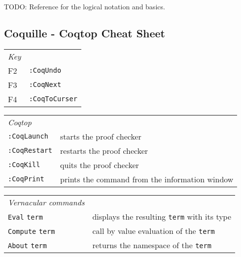 TODO: Reference for the logical notation and basics.

\subsection{Coquille - Coqtop Cheat Sheet}

\begin{table}[h]
		\begin{left}
			\begin{tabular}{l|l}
			  \emph{Key}\\ 		
		      F2      & \lstinline!:CoqUndo! \\ 	     	                                                   
		      F3      & \lstinline!:CoqNext! \\         
		      F4      & \lstinline!:CoqToCurser!  
		    \end{tabular}
		\end{left}
		\label{tab:coquilleCheatSheetKeys}
	\end{table}		    
\begin{table}[h]
		\begin{left}		    	
		    \begin{tabular}{l|l}
		    \emph{Coqtop}\\
		    \lstinline!:CoqLaunch!  &   starts the proof checker\\   
		    \lstinline!:CoqRestart! &   restarts the proof checker \\       
		    \lstinline!:CoqKill!    &   quits the proof checker \\        
		    \lstinline!:CoqPrint!   &   prints the command from the information window \\
		    \end{tabular}
		    \label{tab:coquilleCheatSheetCoqTop}
		\end{left} 
	\end{table}			    
\begin{table}[h]
		\begin{left}		    
     	     \begin{tabular}{l|l}
     	     \emph{Vernacular commands}\\
		          \lstinline!Eval!  \texttt{term}     & displays the resulting \texttt{term} with its type  \\  
		          \lstinline!Compute! \texttt{term}   & call by value evaluation of the \texttt{term} \\          	          
		          \lstinline!About! \texttt{term}     & returns the namespace of the \texttt{term}
	   		\end{tabular}
	   			\label{tab:coquilleCheatSheetVernacular}
		\end{left} 
	\end{table}		  
	

